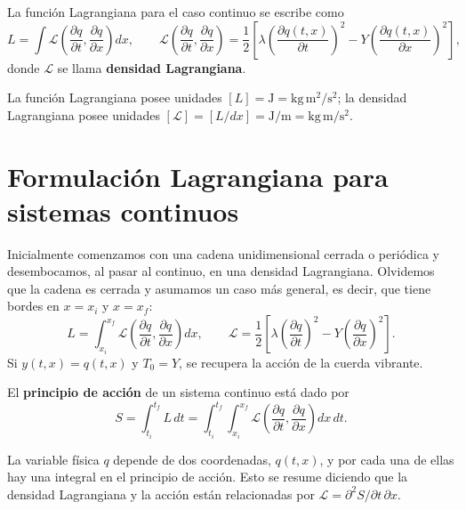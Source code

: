 \begin{definicion}
La función Lagrangiana para el caso continuo se escribe como
\[
L = \int \mathscr{L}\left(\frac{\partial q}{\partial t}, \frac{\partial
q}{\partial x}\right) dx, \qquad \mathscr{L}\left(\frac{\partial
q}{\partial t}, \frac{\partial q}{\partial x}\right) = \frac12\left[
\lambda\left(\frac{\partial q(t,x)}{\partial t}\right)^2 -
Y\left(\frac{\partial q(t,x)}{\partial x}\right)^2\right],
\]
donde $\mathscr{L}$ se llama \textbf{densidad Lagrangiana}.
\end{definicion}

\begin{observacion}
La función Lagrangiana posee unidades $[L]=\text{J}=\text{kg}\,
\text{m}^2/\text{s}^2$; la densidad Lagrangiana posee unidades
$[\mathscr{L}] = [L/dx] = \text{J}/\text{m} = \text{kg}\,\text{m}/
\text{s}^2$.
\end{observacion}

\section{Formulación Lagrangiana para sistemas continuos}

Inicialmente comenzamos con una cadena unidimensional cerrada o periódica
y desembocamos, al pasar al continuo, en una densidad Lagrangiana.
Olvidemos que la cadena es cerrada y asumamos un caso más general, es
decir, que tiene bordes en $x=x_i$ y $x=x_f$:
\[
L = \int_{x_i}^{x_f} \mathscr{L}\left(\frac{\partial q}{\partial t},
\frac{\partial q}{\partial x}\right) dx, \qquad \mathscr{L} = \frac12
\left[\lambda\left(\frac{\partial q}{\partial t}\right)^2 -
Y\left(\frac{\partial q}{\partial x}\right)^2\right].
\]
Si $y(t,x)=q(t,x)$ y $T_0=Y$, se recupera la acción de la cuerda
vibrante.

\begin{definicion}
El \textbf{principio de acción} de un sistema continuo está dado por
\[
S = \int_{t_i}^{t_f} L\, dt = \int_{t_i}^{t_f}\int_{x_i}^{x_f}
\mathscr{L}\left(\frac{\partial q}{\partial t}, \frac{\partial
q}{\partial x}\right) dx\, dt .
\]
\end{definicion}

\begin{observacion}
La variable física $q$ depende de dos coordenadas, $q(t,x)$, y por cada
una de ellas hay una integral en el principio de acción. Esto se resume
diciendo que la densidad Lagrangiana y la acción están relacionadas por
$\mathscr{L} = \partial^2 S/\partial t\,\partial x$.
\end{observacion}

